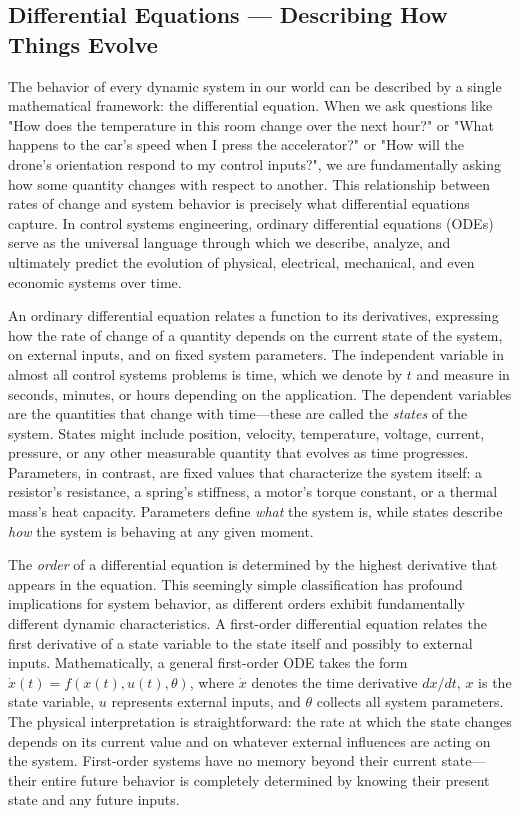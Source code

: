 \subsection{Differential Equations — Describing How Things Evolve}

The behavior of every dynamic system in our world can be described by a single mathematical framework: the differential equation. When we ask questions like "How does the temperature in this room change over the next hour?" or "What happens to the car's speed when I press the accelerator?" or "How will the drone's orientation respond to my control inputs?", we are fundamentally asking how some quantity changes with respect to another. This relationship between rates of change and system behavior is precisely what differential equations capture. In control systems engineering, ordinary differential equations (ODEs) serve as the universal language through which we describe, analyze, and ultimately predict the evolution of physical, electrical, mechanical, and even economic systems over time.

An ordinary differential equation relates a function to its derivatives, expressing how the rate of change of a quantity depends on the current state of the system, on external inputs, and on fixed system parameters. The independent variable in almost all control systems problems is time, which we denote by $t$ and measure in seconds, minutes, or hours depending on the application. The dependent variables are the quantities that change with time—these are called the \emph{states} of the system. States might include position, velocity, temperature, voltage, current, pressure, or any other measurable quantity that evolves as time progresses. Parameters, in contrast, are fixed values that characterize the system itself: a resistor's resistance, a spring's stiffness, a motor's torque constant, or a thermal mass's heat capacity. Parameters define \emph{what} the system is, while states describe \emph{how} the system is behaving at any given moment.

The \emph{order} of a differential equation is determined by the highest derivative that appears in the equation. This seemingly simple classification has profound implications for system behavior, as different orders exhibit fundamentally different dynamic characteristics. A first-order differential equation relates the first derivative of a state variable to the state itself and possibly to external inputs. Mathematically, a general first-order ODE takes the form $\dot{x}(t) = f(x(t), u(t), \theta)$, where $\dot{x}$ denotes the time derivative $dx/dt$, $x$ is the state variable, $u$ represents external inputs, and $\theta$ collects all system parameters. The physical interpretation is straightforward: the rate at which the state changes depends on its current value and on whatever external influences are acting on the system. First-order systems have no memory beyond their current state—their entire future behavior is completely determined by knowing their present state and any future inputs.

